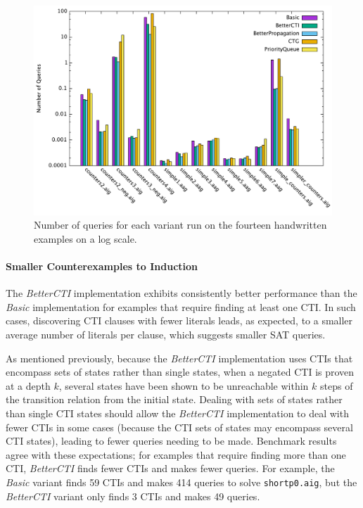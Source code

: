 \documentclass[12pt,a4paper,twoside,openright]{report}
\begin{document}
{\begin{figure}[!ht]
\includegraphics[width=16cm]{numqueries.pdf}
\caption{Number of queries for each variant run on the fourteen handwritten examples on a log scale.}
\end{figure}

\paragraph{Smaller Counterexamples to Induction}{
The \emph{BetterCTI} implementation exhibits consistently
better performance than the \emph{Basic} implementation for examples
that require finding at least one CTI. In such cases,
discovering CTI clauses with fewer literals leads, as expected, to a smaller average number of
literals per clause, which suggests smaller SAT queries.

As mentioned previously, because the \emph{BetterCTI} implementation uses
CTIs that encompass sets of states rather than single states, when a negated CTI is proven at a depth
$k$, several states have been shown to be unreachable within $k$ steps of the transition relation
from the initial state. Dealing with sets of states rather than single CTI states should allow
the \emph{BetterCTI} implementation to deal with fewer CTIs in some cases (because the CTI sets of states
may encompass several CTI states), leading to fewer queries needing to be made. Benchmark results
agree with these expectations; for examples that require finding more than one CTI, \emph{BetterCTI}
finds fewer CTIs and makes fewer queries. For example, the \emph{Basic} variant finds 59
CTIs and makes 414 queries to solve \verb,shortp0.aig,, but the \emph{BetterCTI} variant only
finds 3 CTIs and makes 49 queries.

}}
\end{document}
